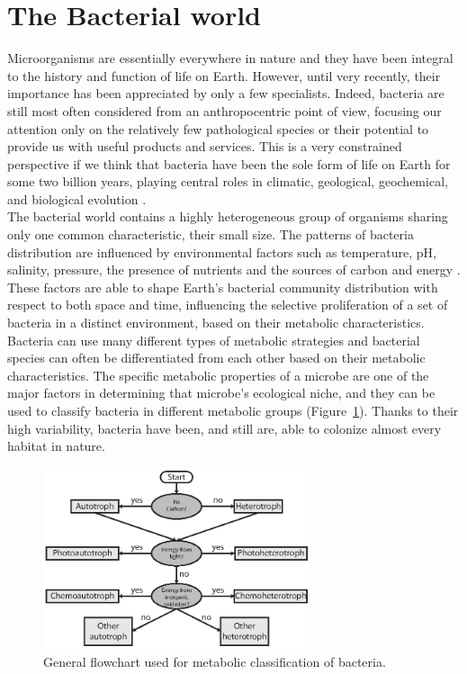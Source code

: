 \section{The Bacterial world}
Microorganisms are essentially everywhere in nature and they have been integral to the history and function of life on Earth. However, until very recently, their importance has been appreciated by only a few specialists. Indeed, bacteria are still most often considered from an anthropocentric point of view, focusing our attention only on the relatively few pathological species or their potential to provide us with useful products and services. This is a very constrained perspective if we think that bacteria have been the sole form of life on Earth for some two billion years, playing central roles in climatic, geological, geochemical, and biological evolution \cite{cavalier2006cell}.\\
The bacterial world contains a highly heterogeneous group of organisms sharing only one common characteristic, their small size. The patterns of bacteria distribution are influenced by environmental factors such as temperature, pH, salinity, pressure, the presence of nutrients and the sources of carbon and energy \citep{gerhard1986bacterial}. These factors are able to shape Earth's bacterial community distribution with respect to both space and time, influencing the selective proliferation of a set of bacteria in a distinct environment, based on their metabolic characteristics. Bacteria can use many different types of metabolic strategies and bacterial species can often be differentiated from each other based on their metabolic characteristics. The specific metabolic properties of a microbe are one of the major factors in determining that microbe’s ecological niche, and they can be used to classify bacteria in different metabolic groups (Figure~\ref{fig:bacmet}). Thanks to their high variability, bacteria have been, and still are, able to colonize almost every habitat in nature.\\%
\begin{figure}[!tb]
	\centering
	\includegraphics[width=0.7\textwidth]{./figures/Introduction/bacterial_metabolism_bw}
  	\caption{General flowchart used for metabolic classification of bacteria. \label{fig:bacmet}}
\end{figure}%

